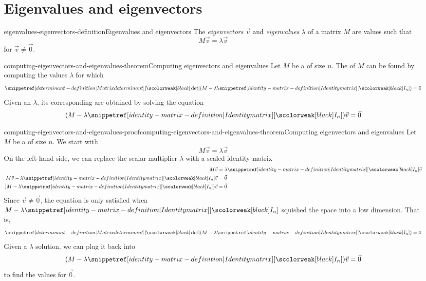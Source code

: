 \documentclass[preview]{standalone}
\begin{document}
\genpage

\section{Eigenvalues and eigenvectors}

\begin{snippetdefinition}{eigenvalues-eigenvectors-definition}{Eigenvalues and eigenvectors}
    The \textit{eigenvectors} \(\vec{v}\) and \textit{eigenvalues} \(\lambda\) of a matrix \(M\)
    are values such that
    \[
        M\vec{v} = \lambda \vec{v}
    \]
    for \(\vec{v}\neq \vec{0}\).
\end{snippetdefinition}


\begin{snippettheorem}{computing-eigenvectors-and-eigenvalues-theorem}{Computing eigenvectors and eigenvalues}
    Let \(M\) be a \matrix of size \(n\).
    The \eigenvalue[eigenvalues] of \(M\) can be found by computing the values \(\lambda\) for which
    \[ \det(M-\lambda \identmatrix{n}) = 0 \]
    Given an \eigenvalue \(\lambda\), its corresponding \eigenvector[eigenvectors] are
    obtained by solving the equation
    \[ (M - \lambda \identmatrix{n})\vec{v} = \vec{0} \]
\end{snippettheorem}

\begin{snippetproof}{computing-eigenvectors-and-eigenvalues-proof}{computing-eigenvectors-and-eigenvalues-theorem}{Computing eigenvectors and eigenvalues}
    Let \(M\) be a \matrix of size \(n\).
    We start with
    \[
        M\vec{v} = \lambda \vec{v}
    \]
    On the left-hand side, we can replace the scalar multiplier \(\lambda\) with
    a scaled identity matrix
    \begin{align*}
        M\vec{v} &= \lambda \identmatrix{n} \vec{v} \\
        M\vec{v} - \lambda \identmatrix{n} \vec{v} &= \vec{0} \\
        (M - \lambda \identmatrix{n})\vec{v} &= \vec{0}
    \end{align*}
    Since \(\vec{v} \neq \vec{0}\), the equation is only satisfied
    when \(M - \lambda \identmatrix{n}\) squished the space into a low dimension. That is,
    \[ \det(M-\lambda \identmatrix{n}) = 0 \]
    Given a \(\lambda\) solution, we can plug it back into
    \[ (M - \lambda \identmatrix{n})\vec{v} = \vec{0} \] to find the values for \(\vec{0}\).
\end{snippetproof}
\end{document}
